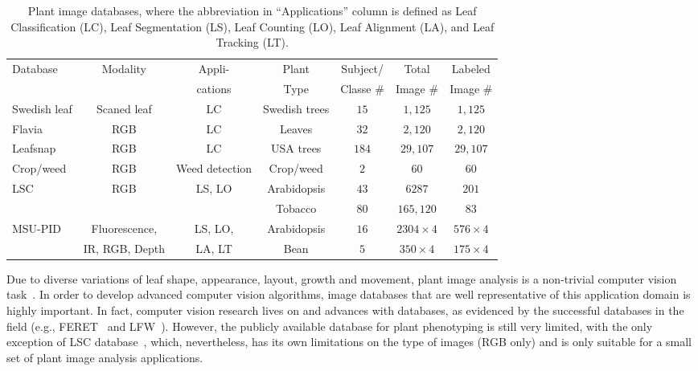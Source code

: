 \begin{table*}[t!]
	\centering
	\caption{Plant image databases, where the abbreviation in ``Applications'' column is defined as Leaf Classification (LC), Leaf Segmentation (LS), Leaf Counting (LO), Leaf Alignment (LA), and Leaf Tracking (LT).}
	\begin{tabular}{l|c|c|c|c|c|c}
		\hline
		\multirow{2}{*}{Database}&  \multirow{2}{*}{Modality}  & Appli-& Plant & Subject/ &Total  &  Labeled   \\ 						
			&         & cations &            Type         &       Classe \#         &  Image \#    & Image \# \\ \hline
		
Swedish leaf &  Scaned leaf & LC& Swedish trees & $15$ & $1,125$ & $1,125$ \\ \hline
Flavia& RGB  & LC& Leaves & $32$  & $2,120$ & $2,120$ \\ \hline
Leafsnap  & RGB & LC& USA trees & $184$ & $29,107$  &  $29,107$ \\ \hline
Crop/weed &  RGB &Weed detection & Crop/weed & $2$  & $60$ & $60$ \\ \hline
\multirow{2}{*}{LSC} & \multirow{2}{*}{RGB}  & \multirow{2}{*}{LS, LO} & Arabidopsis &  $43$ & $6287$ & $201$ \\ \cline{4-7}
							    &  & & Tobacco & $80$ & $165,120$ & $83$ \\ \hline
\multirow{2}{*}{MSU-PID}  & Fluorescence,  & LS, LO, & Arabidopsis &  $16$ &  $2304\times 4$ & $576\times 4$     \\ \cline{4-7}
							    & IR, RGB, Depth & LA, LT & Bean & $5$ & $350\times 4$  &  $175\times 4$ \\ \hline
	       \hline
	\end{tabular}
	\label{tab:database}
\end{table*}

Due to diverse variations of leaf shape, appearance, layout, growth and movement, plant image analysis is a non-trivial computer vision task~\cite{Minervini2015}. 
In order to develop advanced computer vision algorithms, image databases that are well representative of this application domain is highly important. 
In fact, computer vision research lives on and advances with databases, as evidenced by the successful databases in the field (e.g., FERET~\cite{Phillips2000} and LFW~\cite{LFW}). 
However, the publicly available database for plant phenotyping is still very limited, with the only exception of LSC database~\cite{scharr2014annotated}, which, nevertheless, has its own limitations on the type of images (RGB only) and is only suitable for a small set of plant image analysis applications.



